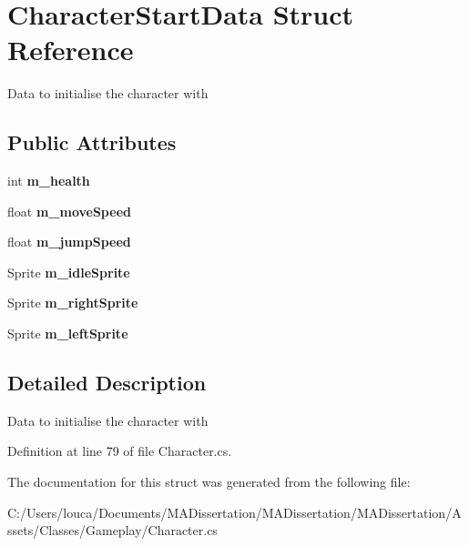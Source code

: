 \hypertarget{struct_character_start_data}{}\section{Character\+Start\+Data Struct Reference}
\label{struct_character_start_data}


Data to initialise the character with  


\subsection*{Public Attributes}
\begin{DoxyCompactItemize}
\item 
\mbox{\label{struct_character_start_data_a97d16f5fe4a9be0e6a010ad0fde5ac86}} 
int {\bfseries m\+\_\+health}
\item 
\mbox{\label{struct_character_start_data_ae14b830ff22f4ac423ac786508e3575f}} 
float {\bfseries m\+\_\+move\+Speed}
\item 
\mbox{\label{struct_character_start_data_a708b3c236235a419bb60048ea399845a}} 
float {\bfseries m\+\_\+jump\+Speed}
\item 
\mbox{\label{struct_character_start_data_ae6795c9f129c702fddddaa554532d50e}} 
Sprite {\bfseries m\+\_\+idle\+Sprite}
\item 
\mbox{\label{struct_character_start_data_a3c7987adaffb5bebbd3142fbe3f9694f}} 
Sprite {\bfseries m\+\_\+right\+Sprite}
\item 
\mbox{\label{struct_character_start_data_ac97181cdb1db77dcfda4c944bd122ed4}} 
Sprite {\bfseries m\+\_\+left\+Sprite}
\end{DoxyCompactItemize}


\subsection{Detailed Description}
Data to initialise the character with 



Definition at line 79 of file Character.\+cs.



The documentation for this struct was generated from the following file\+:\begin{DoxyCompactItemize}
\item 
C\+:/\+Users/louca/\+Documents/\+M\+A\+Dissertation/\+M\+A\+Dissertation/\+M\+A\+Dissertation/\+Assets/\+Classes/\+Gameplay/Character.\+cs\end{DoxyCompactItemize}
